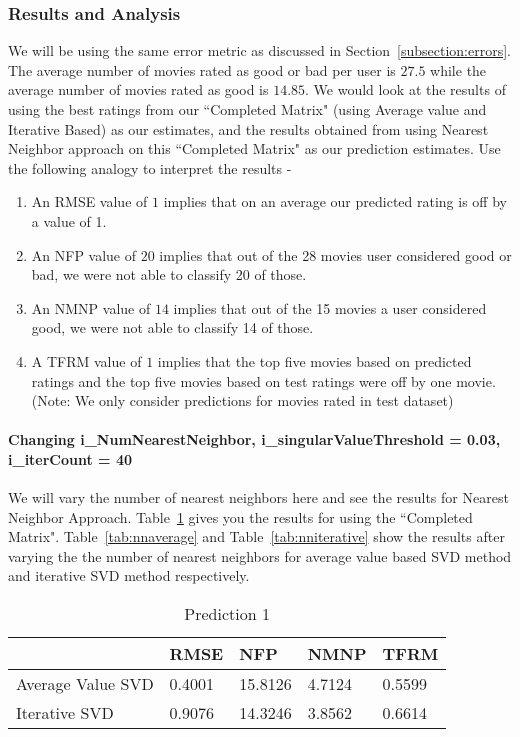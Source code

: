 \begin{enumerate}
\subsubsection{Results and Analysis}
We will be using the same error metric as discussed in Section~\ref{subsection:errors}. The average number of movies rated as good or bad per user is $27.5$ while the average number of movies rated as good is $14.85$. We would look at the results of using the best ratings from our ``Completed Matrix" (using Average value and Iterative Based) as our estimates, and the results obtained from using Nearest Neighbor approach on this ``Completed Matrix" as our prediction estimates. Use the following analogy to interpret the results -
\begin{enumerate}
\item An RMSE value of $1$ implies that on an average our predicted rating is off by a value of 1.
\item An NFP value of $20$ implies that out of the 28 movies user considered good or bad, we were not able to classify 20 of those.
\item An NMNP value of $14$ implies that out of the 15 movies a user considered good, we were not able to classify 14 of those.
\item A TFRM value of $1$ implies that the top five movies based on predicted ratings and the top five movies based on test ratings were off by one movie. (Note: We only consider predictions for movies rated in test dataset)
\end{enumerate}

\paragraph{Changing i\_NumNearestNeighbor, i\_singularValueThreshold = 0.03, i\_iterCount = 40}
We will vary the number of nearest neighbors here and see the results for Nearest Neighbor Approach. Table~\ref{tab:prediction} gives you the results for using the ``Completed Matrix". Table~\ref{tab:nnaverage} and Table~\ref{tab:nniterative} show the results after varying the the number of nearest neighbors for average value based SVD method and iterative SVD method respectively.
\begin{table}[]
\centering
\caption{Prediction 1}
\label{tab:prediction}
\begin{tabular}{|l|l|l|l|l|}
\hline
                  & RMSE   & NFP     & NMNP   & TFRM   \\ \hline
Average Value SVD & 0.4001 & 15.8126 & 4.7124 & 0.5599 \\ \hline
Iterative SVD     & 0.9076 & 14.3246 & 3.8562 & 0.6614 \\ \hline
\end{tabular}
\end{table}


\end{enumerate}
